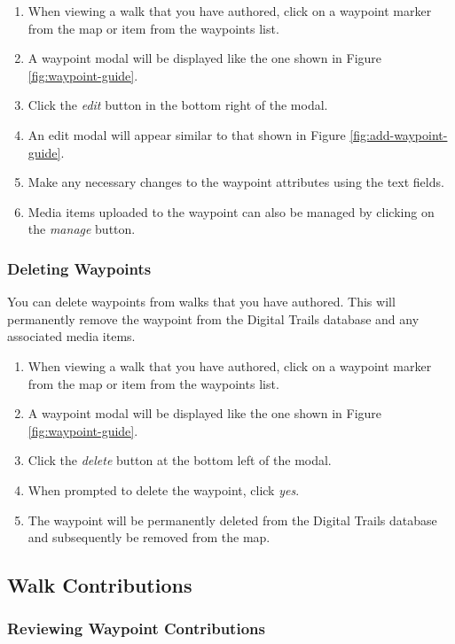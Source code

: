 \documentclass[11pt,a4paper]{report}
\begin{document}
\begin{enumerate}
\item When viewing a walk that you have authored, click on a waypoint marker from the map or item from the waypoints list.
\item A waypoint modal will be displayed like the one shown in Figure \ref{fig:waypoint-guide}.
\item Click the \emph{edit} button in the bottom right of the modal.
\item An edit modal will appear similar to that shown in Figure \ref{fig:add-waypoint-guide}.
\item Make any necessary changes to the waypoint attributes using the text fields.
\item Media items uploaded to the waypoint can also be managed by clicking on the \emph{manage} button.
\end{enumerate}

\subsubsection{Deleting Waypoints}

You can delete waypoints from walks that you have authored. This will permanently remove the waypoint from the Digital Trails database and any associated media items.

\begin{enumerate}
\item When viewing a walk that you have authored, click on a waypoint marker from the map or item from the waypoints list.
\item A waypoint modal will be displayed like the one shown in Figure \ref{fig:waypoint-guide}.
\item Click the \emph{delete} button at the bottom left of the modal.
\item When prompted to delete the waypoint, click \emph{yes}.
\item The waypoint will be permanently deleted from the Digital Trails database and subsequently be removed from the map.
\end{enumerate}

\subsection{Walk Contributions}

\subsubsection{Reviewing Waypoint Contributions}
\end{document}

